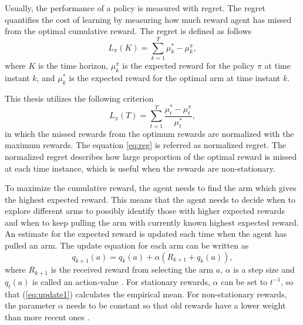 \documentclass[english, 12pt, a4paper, elec, utf8, a-1b, online]{aaltothesis}
\begin{document}
Usually, the performance of a policy is measured with regret.
The regret quantifies the cost of learning by measuring how much reward agent has missed from the optimal cumulative reward.
The regret is defined as follows
\begin{equation}\label{eq:basic_reg}
    L_\pi(K) = \sum_{k=1}^T \mu^*_k - \mu^\pi_k,
\end{equation}
where $K$ is the time horizon, $\mu^\pi_k$ is the expected reward for the policy $\pi$ at time instant $k$, and $\mu_k^*$ is the expected reward for the optimal arm at time instant $k$.

This thesis utilizes the following criterion
\begin{equation}\label{eq:reg}
    L_\pi(T) = \sum_{t=1}^T \frac{\mu^*_t - \mu^\pi_t}{\mu^*_t},
\end{equation}
in which the missed rewards from the optimum rewards are normalized with the maximum rewards.
The equation \eqref{eq:reg} is referred as normalized regret.
The normalized regret describes how large proportion of the optimal reward is missed at each time instance, which is useful when the rewards are non-stationary.

To maximize the cumulative reward, the agent needs to find the arm which gives the highest expected reward.
This means that the agent needs to decide when to explore different arms to possibly identify those with higher expected rewards 
and when to keep pulling the arm with currently known highest expected reward.
An estimate for the expected reward is updated each time when the agent has pulled an arm.
The update equation for each arm can be written as
\begin{equation}\label{eq:update1}
    q_{k+1}(a) = q_{k}(a) + \alpha \left(R_{k+1} + q_{k}(a)\right),
\end{equation}
where $R_{k+1}$ is the received reward from selecting the arm $a$, $\alpha$ is a step size and $q_{t}(a)$ is called an action-value \cite{Sutton2018}.
For stationary rewards, $\alpha$ can be set to $t^{-1}$, so that (\ref{eq:update1}) calculates the empirical mean. 
For non-stationary rewards, the parameter $\alpha$ needs to be constant so that old rewards have a lower weight than more recent ones \cite{Sutton2018}.
\end{document}
